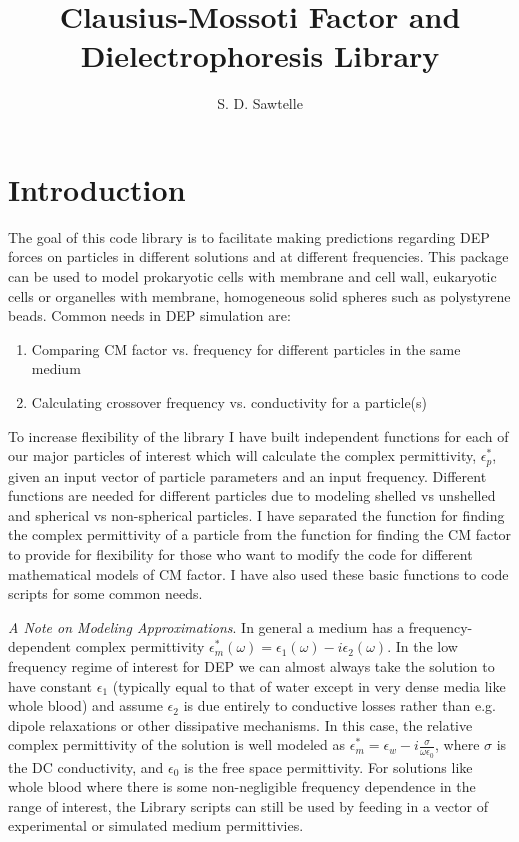 \documentclass[12pt]{article}
\title{Clausius-Mossoti Factor and Dielectrophoresis Library}
\author{S. D. Sawtelle}
\begin{document}
\maketitle 

\begin{spacing}{0.5} \tableofcontents \end{spacing}
\newpage

\section{Introduction}

The goal of this code library is to facilitate making predictions regarding DEP forces on particles in different solutions and at different frequencies. This package can be used to model prokaryotic cells with membrane and cell wall, eukaryotic cells or organelles with membrane, homogeneous solid spheres such as polystyrene beads. Common needs in DEP simulation are:

\begin{enumerate}
  \item Comparing CM factor vs. frequency for different particles in the same medium
  \item Calculating crossover frequency vs. conductivity for a particle(s)
\end{enumerate}


To increase flexibility of the library I have built independent functions for each of our major particles of interest which will calculate the complex permittivity, $\epsilon^*_{p}$, given an input vector of particle parameters and an input frequency. Different functions are needed for different particles due to modeling shelled vs unshelled and spherical vs non-spherical particles. I have separated the function for finding the complex permittivity of a particle from the function for finding the CM factor to provide for flexibility for those who want to modify the code for different mathematical models of CM factor. I have also used these basic functions to code scripts for some common needs. 

\textit{A Note on Modeling Approximations}. In general a medium has a frequency-dependent complex permittivity $\epsilon^*_{m}(\omega)=\epsilon_1(\omega)-i\epsilon_2(\omega)$. In the low frequency regime of interest for DEP we can almost always take the solution to have constant $\epsilon_1$ (typically equal to that of water except in very dense media like whole blood) and assume $\epsilon_2$ is due entirely to conductive losses rather than e.g. dipole relaxations or other dissipative mechanisms. In this case, the relative complex permittivity of the solution is well modeled as $\epsilon^*_{m}=\epsilon_w-i\frac{\sigma}{\omega\epsilon_0}$, where $\sigma$ is the DC conductivity, and $\epsilon_0$ is the free space permittivity. For solutions like whole blood where there is some non-negligible frequency dependence in the range of interest, the Library scripts can still be used by feeding in a vector of experimental or simulated medium permittivies.  
\end{document}
